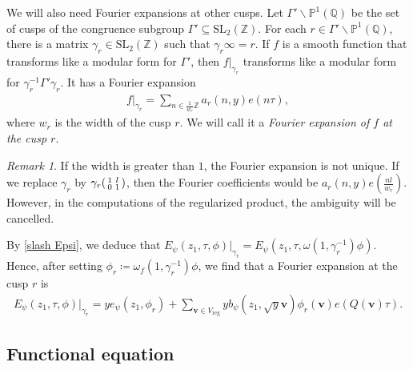\documentclass[twoside,a4paper,10pt]{article} %
\newcommand{\8}{\infty}
\newcommand{\Z}{\mathbb{Z}}
\newcommand{\vbf}{\mathbf{v}}
\newcommand{\SL}{\mathrm{SL}}
\newcommand{\Q}{\mathbb{Q}}
\newcommand{\PP}{\mathbb{P}}
\newcommand{\reg}{\mathrm{reg}}
\theoremstyle{mytheoremstyle}
\theoremstyle{remark}
\newtheorem{rmk}{Remark}[section]
\numberwithin{equation}{section}
\begin{document}
We will also need Fourier expansions at other cusps.  Let $\Gamma' \backslash \PP^1(\Q)$ be the set of cusps of the congruence subgroup $\Gamma' \subseteq \SL_2(\Z)$. For each $r \in \Gamma' \backslash \PP^1(\Q)$, there is a matrix $\gamma_r \in \SL_2(\Z)$ such that $\gamma_r \8=r$. If $f$ is a smooth function that transforms like a modular form for $\Gamma'$, then $f \vert_{\gamma_r}$ transforms like a modular form for $\gamma_r^{-1}\Gamma' \gamma_r$. It has a Fourier expansion
\begin{align} \label{width denominator}
f \vert_{\gamma_r}=\sum_{n \in \frac{1}{w_r}\Z} a_r\left (n,y \right )e \left ( n \tau\right ),
\end{align}
where $w_r$ is the width of the cusp $r$. We will call it a  {\em Fourier expansion of $f$ at the cusp $r$}.
\begin{rmk} If the width is greater than $1$, the Fourier expansion is not unique. If we replace $\gamma_r$ by $\gamma_r \begin{psmallmatrix} 1 & l \\ 0 & 1 \end{psmallmatrix}$, then the Fourier coefficients would be $a_r(n,y)e \left ( \frac{n l}{w_r}\right )$. However, in the computations of the regularized product, the ambiguity will be cancelled.
\end{rmk}
By \eqref{slash Epsi}, we deduce that $E_\psi(z_1,\tau,\phi) \vert_{\gamma_r}=E_\psi(z_1,\tau,\omega(1,\gamma_r^{-1})\phi)$. Hence, after setting $\phi_r \coloneqq \omega_f(1,\gamma_r^{-1})\phi$, we find that a Fourier expansion at the cusp $r$ is
\begin{align} \label{fourier Epsi p}
E_\psi(z_1,\tau,\phi) \vert_{\gamma_r} =ye_\psi(z_1,\phi_r)+\sum_{\vbf \in V_\reg} y b_\psi(z_1,\sqrt{y}\vbf) \phi_r(\vbf) e(Q(\vbf)\tau).
\end{align}











\subsection{Functional equation} \label{section func}
\end{document}
